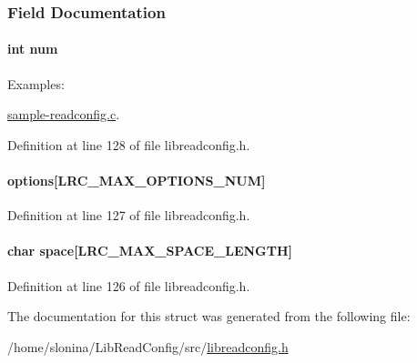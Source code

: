 \subsubsection{Field Documentation}
\hypertarget{struct_l_r_c__config_namespace_a86cf672daa4e0ad11ad10efc894d19c8}{
\paragraph[{num}]{\setlength{\rightskip}{0pt plus 5cm}int {\bf num}}\hfill}
\label{struct_l_r_c__config_namespace_a86cf672daa4e0ad11ad10efc894d19c8}
\begin{Desc}
\item[Examples: ]\par
\hyperlink{sample-readconfig_8c-example}{sample-\/readconfig.c}.\end{Desc}


Definition at line 128 of file libreadconfig.h.\hypertarget{struct_l_r_c__config_namespace_a16c789b044489f42de63f78f84b539ba}{
\paragraph[{options}]{ {\bf options}\mbox{[}LRC\_\-MAX\_\-OPTIONS\_\-NUM\mbox{]}}\hfill}
\label{struct_l_r_c__config_namespace_a16c789b044489f42de63f78f84b539ba}


Definition at line 127 of file libreadconfig.h.\hypertarget{struct_l_r_c__config_namespace_a4754d9e0429a1914e3617de872b4a736}{
\paragraph[{space}]{\setlength{\rightskip}{0pt plus 5cm}char {\bf space}\mbox{[}LRC\_\-MAX\_\-SPACE\_\-LENGTH\mbox{]}}\hfill}
\label{struct_l_r_c__config_namespace_a4754d9e0429a1914e3617de872b4a736}


Definition at line 126 of file libreadconfig.h.

The documentation for this struct was generated from the following file:\begin{DoxyCompactItemize}
\item 
/home/slonina/LibReadConfig/src/\hyperlink{libreadconfig_8h}{libreadconfig.h}\end{DoxyCompactItemize}

